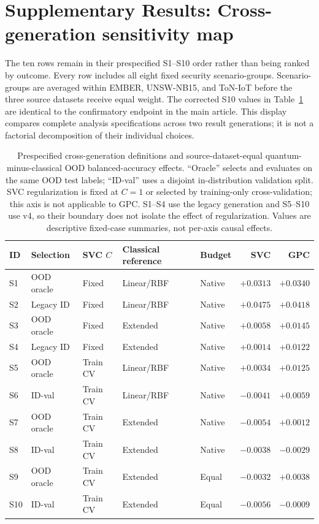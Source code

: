 \documentclass[11pt]{article}
\begin{document}
\section*{Supplementary Results: Cross-generation sensitivity map}
\label{supp:specification}

The ten rows remain in their prespecified S1--S10 order rather than being
ranked by outcome. Every row includes all eight fixed security
scenario-groups. Scenario-groups are averaged within EMBER, UNSW-NB15, and
ToN-IoT before the three source datasets receive equal weight. The corrected
S10 values in Table~\ref{supp:tab_specification} are identical to the
confirmatory endpoint in the main article. This display compares complete
analysis specifications across two result generations; it is not a factorial
decomposition of their individual choices.

\begin{table}[ht]
\centering
\caption{Prespecified cross-generation definitions and source-dataset-equal
quantum-minus-classical OOD balanced-accuracy effects. ``Oracle'' selects and
evaluates on the same OOD test labels; ``ID-val'' uses a disjoint
in-distribution validation split. SVC regularization is fixed at $C=1$ or
selected by training-only cross-validation; this axis is not applicable to
GPC. S1--S4 use the legacy generation and S5--S10 use v4, so their boundary
does not isolate the effect of regularization. Values are descriptive
fixed-case summaries, not per-axis causal effects.}
\label{supp:tab_specification}
\scriptsize
\setlength{\tabcolsep}{3pt}
\begin{tabular}{lllllrr}
\toprule
ID & Selection & SVC $C$ & Classical reference & Budget & SVC & GPC \\
\midrule
S1  & OOD oracle & Fixed & Linear/RBF & Native & $+0.0313$ & $+0.0340$ \\
S2  & Legacy ID & Fixed & Linear/RBF & Native & $+0.0475$ & $+0.0418$ \\
S3  & OOD oracle & Fixed & Extended & Native & $+0.0058$ & $+0.0145$ \\
S4  & Legacy ID & Fixed & Extended & Native & $+0.0014$ & $+0.0122$ \\
S5  & OOD oracle & Train CV & Linear/RBF & Native & $+0.0034$ & $+0.0125$ \\
S6  & ID-val & Train CV & Linear/RBF & Native & $-0.0041$ & $+0.0059$ \\
S7  & OOD oracle & Train CV & Extended & Native & $-0.0054$ & $+0.0012$ \\
S8  & ID-val & Train CV & Extended & Native & $-0.0038$ & $-0.0029$ \\
S9  & OOD oracle & Train CV & Extended & Equal & $-0.0032$ & $+0.0038$ \\
S10 & ID-val & Train CV & Extended & Equal & $-0.0056$ & $-0.0009$ \\
\bottomrule
\end{tabular}
\end{table}
\end{document}
